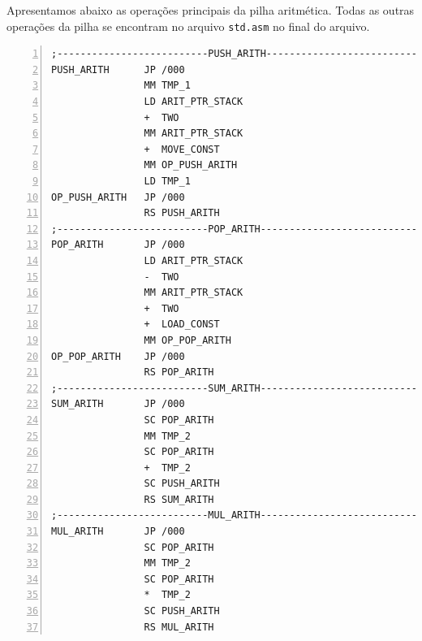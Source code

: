 Apresentamos abaixo as operações principais da pilha aritmética. Todas as
outras operações da pilha se encontram no arquivo \verb!std.asm! no final do arquivo.


\begin{lstlisting}[frame=single,numbers=left,breaklines=true]
;--------------------------PUSH_ARITH------------------------------
PUSH_ARITH      JP /000
                MM TMP_1
                LD ARIT_PTR_STACK 
                +  TWO
                MM ARIT_PTR_STACK
                +  MOVE_CONST
                MM OP_PUSH_ARITH
                LD TMP_1
OP_PUSH_ARITH   JP /000 
                RS PUSH_ARITH 
;--------------------------POP_ARITH-------------------------------
POP_ARITH       JP /000 
                LD ARIT_PTR_STACK 
                -  TWO
                MM ARIT_PTR_STACK 
                +  TWO 
                +  LOAD_CONST 
                MM OP_POP_ARITH
OP_POP_ARITH    JP /000
                RS POP_ARITH 
;--------------------------SUM_ARITH-------------------------------
SUM_ARITH       JP /000 
                SC POP_ARITH
                MM TMP_2 
                SC POP_ARITH
                +  TMP_2 
                SC PUSH_ARITH
                RS SUM_ARITH 
;--------------------------MUL_ARITH-------------------------------
MUL_ARITH       JP /000 
                SC POP_ARITH
                MM TMP_2 
                SC POP_ARITH 
                *  TMP_2 
                SC PUSH_ARITH
                RS MUL_ARITH 
\end{lstlisting}
